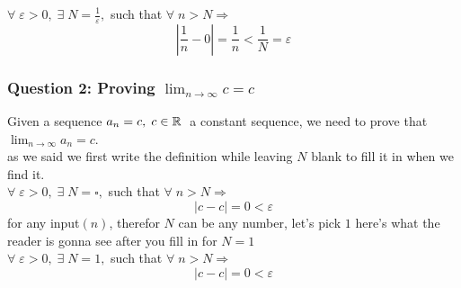 \noindent$\forall \; \varepsilon>0,\; \exists \; N = \frac{1}{\varepsilon} ,$ such that $\forall \; n>N \Longrightarrow$\\
\[
    |\frac{1}{n}-0|=\frac{1}{n}<\frac{1}{N} = \varepsilon
\]



\subsubsection{Question 2: Proving \(\lim_{n \to \infty} c = c\)}
Given a sequence $a_n = c ,\; c\in \mathbb{R}\;$ a constant sequence, we need to prove that $\lim_{n\to\infty}a_n = c$.\\
as we said we first write the definition while leaving $N$ blank to fill it in when we find it.\\
$\forall \; \varepsilon>0,\; \exists \; N = \square ,$ such that $\forall \; n>N \Longrightarrow$\\
\[
    |c-c| = 0 <\varepsilon
\]
for any input$(n)$, therefor $N$ can be any number, let's pick $1$
here's what the reader is gonna see after you fill in for $N=1$\\
$\forall \; \varepsilon>0,\; \exists \; N = 1 ,$ such that $\forall \; n>N \Longrightarrow$\\
\[
    |c-c|=0<\varepsilon
\]



